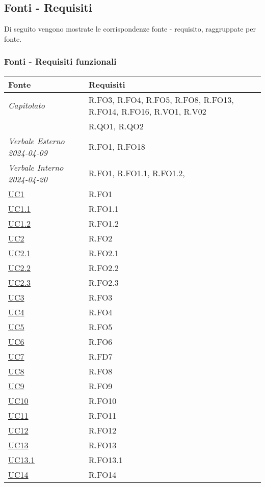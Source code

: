 \subsection{Fonti - Requisiti}
Di seguito vengono mostrate le corrispondenze fonte - requisito, raggruppate per fonte.

\subsubsection{Fonti - Requisiti funzionali}

\begin{longtable}{|P{4,5cm}|>{\arraybackslash}P{9cm}|}
  \hline
  \textbf{Fonte} & \textbf{Requisiti} \\
  \hline
  \emph{Capitolato} & R.FO3, R.FO4, R.FO5, R.FO8, R.FO13, R.FO14, R.FO16, R.VO1, R.V02 \\
  \hline
  \NdP{} & R.QO1, R.QO2 \\
  \hline
  \emph{Verbale Esterno 2024-04-09} & R.FO1, R.FO18 \\
  \hline
  \emph{Verbale Interno 2024-04-20} & R.FO1, R.FO1.1, R.FO1.2,  \\
  \hline
  \hyperref[UC1]{UC1} & R.FO1 \\
  \hline
  \hyperref[UC1point1]{UC1.1} & R.FO1.1 \\
  \hline
  \hyperref[UC1]{UC1.2} & R.FO1.2 \\
  \hline
  \hyperref[UC2]{UC2} & R.FO2 \\
  \hline
  \hyperref[UC2point1]{UC2.1} & R.FO2.1 \\
  \hline
  \hyperref[UC2point2]{UC2.2} & R.FO2.2 \\
  \hline
  \hyperref[UC2point3]{UC2.3} & R.FO2.3 \\
  \hline
  \hyperref[UC3]{UC3} & R.FO3 \\
  \hline
  \hyperref[UC4]{UC4} & R.FO4 \\
  \hline
  \hyperref[UC5]{UC5} & R.FO5 \\
  \hline
  \hyperref[UC6]{UC6} & R.FO6 \\
  \hline
  \hyperref[UC7]{UC7} & R.FD7 \\
  \hline
  \hyperref[UC8]{UC8} & R.FO8 \\
  \hline
  \hyperref[UC9]{UC9} & R.FO9 \\
  \hline
  \hyperref[UC10]{UC10} & R.FO10 \\
  \hline
  \hyperref[UC11]{UC11} & R.FO11 \\
  \hline
  \hyperref[UC12]{UC12} & R.FO12 \\
  \hline
  \hyperref[UC13]{UC13} & R.FO13 \\
  \hline
  \hyperref[UC13point1]{UC13.1} & R.FO13.1 \\
  \hline
  \hyperref[UC14]{UC14} & R.FO14 \\
  \hline


\end{longtable}
